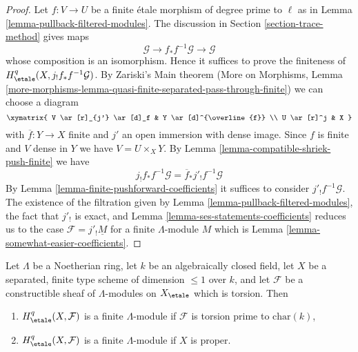\begin{proof}
Let $f : V \to U$ be a finite \'etale morphism of degree prime to $\ell$
as in Lemma \ref{lemma-pullback-filtered-modules}. The discussion in
Section \ref{section-trace-method} gives maps
$$
\mathcal{G} \to f_*f^{-1}\mathcal{G} \to \mathcal{G}
$$
whose composition is an isomorphism. Hence it suffices to prove the
finiteness of $H^q_\etale(X, j_!f_*f^{-1}\mathcal{G})$.
By Zariski's Main theorem
(More on Morphisms, Lemma
\ref{more-morphisms-lemma-quasi-finite-separated-pass-through-finite})
we can choose a diagram
$$
\xymatrix{
V \ar[r]_{j'} \ar[d]_f & Y \ar[d]^{\overline{f}} \\
U \ar[r]^j & X
}
$$
with $\overline{f} : Y \to X$ finite and $j'$ an open immersion with
dense image. Since $f$ is finite and $V$ dense in $Y$ we have
$V = U \times_X Y$. By Lemma \ref{lemma-compatible-shriek-push-finite} we have
$$
j_!f_*f^{-1}\mathcal{G} = \overline{f}_*j'_!f^{-1}\mathcal{G}
$$
By Lemma \ref{lemma-finite-pushforward-coefficients} it suffices to
consider $j'_!f^{-1}\mathcal{G}$. The existence of the filtration given by
Lemma \ref{lemma-pullback-filtered-modules},
the fact that $j'_!$ is exact, and
Lemma \ref{lemma-ses-statements-coefficients}
reduces us to the case
$\mathcal{F} = j'_!\underline{M}$ for a finite $\Lambda$-module $M$
which is Lemma \ref{lemma-somewhat-easier-coefficients}.
\end{proof}

\begin{theorem}
\label{theorem-vanishing-affine-curves-coefficients}
Let $\Lambda$ be a Noetherian ring, let $k$ be an algebraically closed field,
let $X$ be a separated, finite type scheme of dimension $\leq 1$ over $k$,
and let $\mathcal{F}$ be a constructible sheaf of $\Lambda$-modules
on $X_\etale$ which is torsion. Then
\begin{enumerate}
\item
\label{item-finite-prime-to-p-coefficients}
$H^q_\etale(X, \mathcal{F})$ is a finite $\Lambda$-module
if $\mathcal{F}$ is torsion prime to $\text{char}(k)$,
\item
\label{item-finite-proper-coefficients}
$H^q_\etale(X, \mathcal{F})$ is a finite $\Lambda$-module if $X$ is proper.
\end{enumerate}
\end{theorem}


